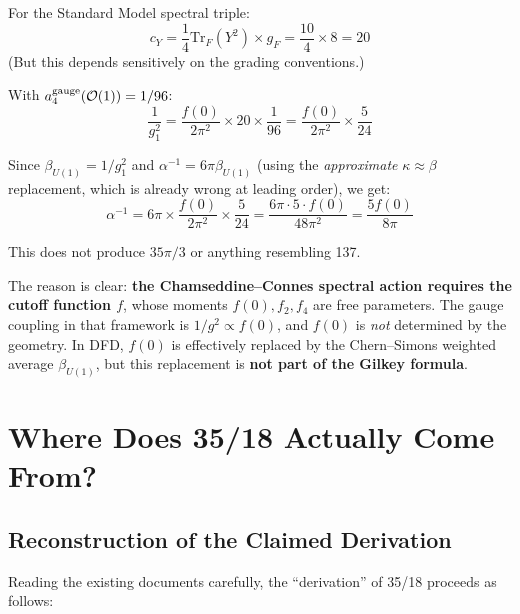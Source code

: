 \documentclass[12pt,a4paper]{article}
\theoremstyle{definition}
\begin{document}
For the Standard Model spectral triple:
\begin{equation}
c_Y = \frac{1}{4}\mathrm{Tr}_F(Y^2) \times g_F = \frac{10}{4} \times 8
= 20
\end{equation}
(But this depends sensitively on the grading conventions.)

With $a_4^{\rm gauge}(\mathcal{O}(1)) = 1/96$:
\begin{equation}
\frac{1}{g_1^2} = \frac{f(0)}{2\pi^2} \times 20 \times \frac{1}{96}
= \frac{f(0)}{2\pi^2} \times \frac{5}{24}
\end{equation}

Since $\beta_{U(1)} = 1/g_1^2$ and $\alpha^{-1} = 6\pi\beta_{U(1)}$
(using the \emph{approximate} $\kappa \approx \beta$ replacement,
which is already wrong at leading order), we get:
\begin{equation}
\alpha^{-1} = 6\pi \times \frac{f(0)}{2\pi^2} \times \frac{5}{24}
= \frac{6\pi \cdot 5 \cdot f(0)}{48\pi^2}
= \frac{5f(0)}{8\pi}
\end{equation}

This does not produce $35\pi/3$ or anything resembling 137.

The reason is clear: \textbf{the Chamseddine--Connes spectral action
requires the cutoff function $f$}, whose moments $f(0), f_2, f_4$
are free parameters.  The gauge coupling in that framework is
$1/g^2 \propto f(0)$, and $f(0)$ is \emph{not} determined by the
geometry.  In DFD, $f(0)$ is effectively replaced by the Chern--Simons
weighted average $\beta_{U(1)}$, but this replacement is
\textbf{not part of the Gilkey formula}.

\section{Where Does 35/18 Actually Come From?}
\label{sec:origin}

\subsection{Reconstruction of the Claimed Derivation}

Reading the existing documents carefully, the ``derivation'' of 35/18
proceeds as follows:
\end{document}
